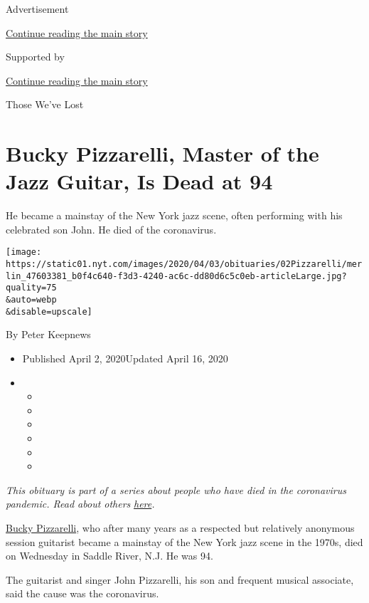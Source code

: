 Advertisement

\protect\hyperlink{after-top}{Continue reading the main story}

Supported by

\protect\hyperlink{after-sponsor}{Continue reading the main story}

Those We've Lost

\hypertarget{bucky-pizzarelli-master-of-the-jazz-guitar-is-dead-at-94}{%
\section{Bucky Pizzarelli, Master of the Jazz Guitar, Is Dead at
94}\label{bucky-pizzarelli-master-of-the-jazz-guitar-is-dead-at-94}}

He became a mainstay of the New York jazz scene, often performing with
his celebrated son John. He died of the coronavirus.

\texttt{[image: https://static01.nyt.com/images/2020/04/03/obituaries/02Pizzarelli/merlin\_47603381\_b0f4c640-f3d3-4240-ac6c-dd80d6c5c0eb-articleLarge.jpg?quality=75\\\&auto=webp\\\&disable=upscale]}

By Peter Keepnews

\begin{itemize}
\item
  Published April 2, 2020Updated April 16, 2020
\item
  \begin{itemize}
  \item
  \item
  \item
  \item
  \item
  \item
  \end{itemize}
\end{itemize}

\emph{This obituary is part of a series about people who have died in
the coronavirus pandemic. Read about others}
\href{https://www.nytimes.com/series/people-who-have-died-of-the-coronavirus}{\emph{here}}\emph{.}

\href{https://www.youtube.com/watch?v=goDqtP4MtqQ}{Bucky Pizzarelli},
who after many years as a respected but relatively anonymous session
guitarist became a mainstay of the New York jazz scene in the 1970s,
died on Wednesday in Saddle River, N.J. He was 94.

The guitarist and singer John Pizzarelli, his son and frequent musical
associate, said the cause was the coronavirus.

